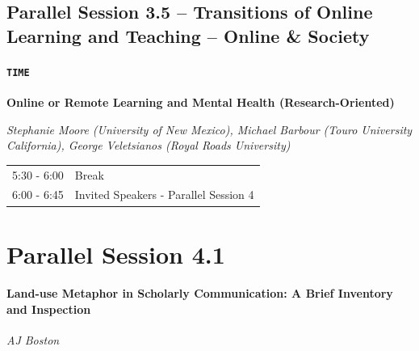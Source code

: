 \documentclass[
]{book}
\begin{document}
\hypertarget{parallel-session-3.5-transitions-of-online-learning-and-teaching-online-society}{%
\subsection*{Parallel Session 3.5 -- Transitions of Online Learning and Teaching -- Online \& Society}\label{parallel-session-3.5-transitions-of-online-learning-and-teaching-online-society}}

\begin{secondary}
\hypertarget{time}{%
\paragraph{\texorpdfstring{\texttt{TIME}}{TIME}}\label{time}}

\textbf{Online or Remote Learning and Mental Health (Research-Oriented)}

\emph{Stephanie Moore (University of New Mexico), Michael Barbour (Touro
University California), George Veletsianos (Royal Roads University)}
\end{secondary}

\begin{longtable}[]{@{}ll@{}}
\toprule
& \\
\midrule
\endhead
5:30 - 6:00 & Break \\
6:00 - 6:45 & Invited Speakers - Parallel Session 4 \\
\bottomrule
\end{longtable}

\hypertarget{parallel-session-4.1}{%
\section*{Parallel Session 4.1}\label{parallel-session-4.1}}

\begin{reflect}
\hypertarget{land-use-metaphor-in-scholarly-communication-a-brief-inventory-and-inspection}{%
\paragraph*{Land-use Metaphor in Scholarly Communication: A Brief
Inventory and
Inspection}\label{land-use-metaphor-in-scholarly-communication-a-brief-inventory-and-inspection}}

\emph{AJ Boston}
\end{reflect}
\end{document}
